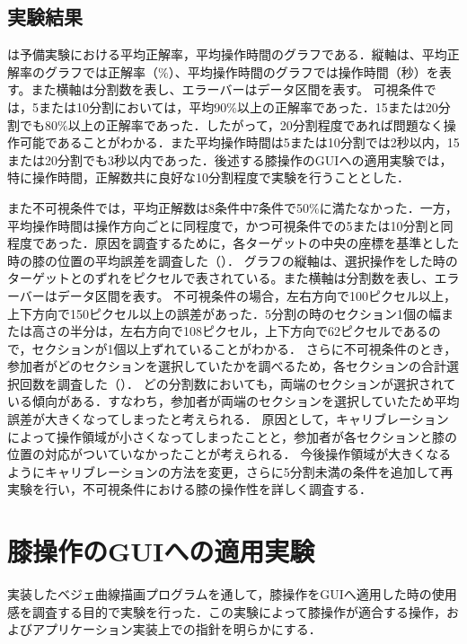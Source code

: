 \documentclass[submit, techrep]{ipsj}
\begin{document}
\subsection{実験結果}
は予備実験における平均正解率，平均操作時間のグラフである．縦軸は、平均正解率のグラフでは正解率（$\%$）、平均操作時間のグラフでは操作時間（秒）を表す。また横軸は分割数を表し、エラーバーはデータ区間を表す。
可視条件では，5または10分割においては，平均90\%以上の正解率であった．15または20分割でも80\%以上の正解率であった．したがって，20分割程度であれば問題なく操作可能であることがわかる．また平均操作時間は5または10分割では2秒以内，15または20分割でも3秒以内であった．後述する膝操作のGUIへの適用実験では，特に操作時間，正解数共に良好な10分割程度で実験を行うこととした．
\par
また不可視条件では，平均正解数は8条件中7条件で50\%に満たなかった．一方，平均操作時間は操作方向ごとに同程度で，かつ可視条件での5または10分割と同程度であった．原因を調査するために，各ターゲットの中央の座標を基準とした時の膝の位置の平均誤差を調査した（）．
グラフの縦軸は、選択操作をした時のターゲットとのずれをピクセルで表されている。また横軸は分割数を表し、エラーバーはデータ区間を表す。
不可視条件の場合，左右方向で100ピクセル以上，上下方向で150ピクセル以上の誤差があった．5分割の時のセクション1個の幅または高さの半分は，左右方向で108ピクセル，上下方向で62ピクセルであるので，セクションが1個以上ずれていることがわかる．
さらに不可視条件のとき，参加者がどのセクションを選択していたかを調べるため，各セクションの合計選択回数を調査した（）．
どの分割数においても，両端のセクションが選択されている傾向がある．すなわち，参加者が両端のセクションを選択していたため平均誤差が大きくなってしまったと考えられる．
原因として，キャリブレーションによって操作領域が小さくなってしまったことと，参加者が各セクションと膝の位置の対応がついていなかったことが考えられる．
今後操作領域が大きくなるようにキャリブレーションの方法を変更，さらに5分割未満の条件を追加して再実験を行い，不可視条件における膝の操作性を詳しく調査する．
\section{膝操作のGUIへの適用実験}
実装したベジェ曲線描画プログラムを通して，膝操作をGUIへ適用した時の使用感を調査する目的で実験を行った．この実験によって膝操作が適合する操作，およびアプリケーション実装上での指針を明らかにする．
\end{document}
